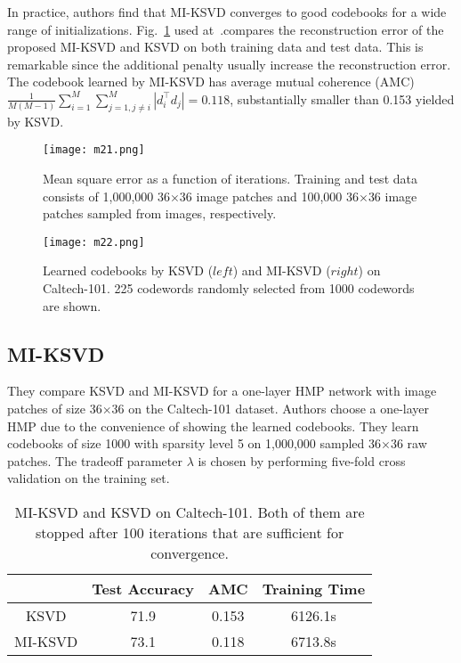 \documentclass[10pt,twocolumn,letterpaper]{article}
\begin{document}
In practice, authors find that MI-KSVD converges to good codebooks for a wide range of initializations. Fig.~\ref{fig1} used at~\cite{multipath}.compares the reconstruction error of the proposed MI-KSVD and KSVD on both training data and test data. This is remarkable since the additional penalty usually increase the reconstruction error. The codebook learned by MI-KSVD has average mutual coherence (AMC) $\frac{1}{M(M-1)}\sum_{i=1}^M\sum_{j=1,j\ne i}^M|d_i^{\top}d_j|=0.118$, substantially smaller than 0.153 yielded by KSVD.
\begin{figure}
\begin{center}
\texttt{[image: m21.png]}
\end{center}
\caption{Mean square error as a function of iterations. Training and test data consists of 1,000,000 36$\times$36 image patches and 100,000 36$\times$36 image patches sampled from images, respectively.}
\label{fig1}
\end{figure}

\begin{figure}
\begin{center}
\texttt{[image: m22.png]}
\end{center}
\caption{Learned codebooks by KSVD ($left$) and MI-KSVD ($right$) on Caltech-101. 225 codewords randomly selected from 1000 codewords are shown.}
\label{fig2}
\end{figure}

\balance

\subsection{MI-KSVD}

They compare KSVD and MI-KSVD for a one-layer HMP network with image patches of size 36$\times$36 on the Caltech-101 dataset. Authors choose a one-layer HMP due to the convenience of showing the learned codebooks. They learn codebooks of size 1000 with sparsity level 5 on 1,000,000 sampled 36$\times$36 raw patches. The tradeoff parameter $\lambda$ is chosen by performing five-fold cross validation on the training set. 

\begin{table}
\begin{center}
\begin{tabular}{|c|c|c|c|}
   \hline
   & Test Accuracy & AMC & Training Time \\
   \hline
   KSVD & 71.9 & 0.153 & 6126.1s \\
   \hline
   MI-KSVD & 73.1 & 0.118 & 6713.8s \\
   \hline
\end{tabular}
\end{center}
\caption{MI-KSVD and KSVD on Caltech-101. Both of them are stopped after 100 iterations that are sufficient for convergence.}
\label{tab}
\end{table}
\end{document}
